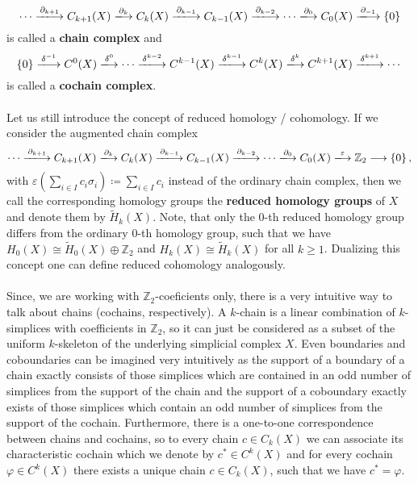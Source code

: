 \[
\cdots\xlongrightarrow{\partial_{k+1}} C_{k+1}(X)\xlongrightarrow{\partial_k} C_k(X)\xlongrightarrow{\partial_{k-1}} C_{k-1}(X)\xlongrightarrow{\partial_{k-2}}\cdots\xlongrightarrow{\partial_0} C_0(X)\xlongrightarrow{\partial_{-1}}\left\{0\right\}
\]
is called a \textbf{chain complex} and
\[
\left\{0\right\}\xlongrightarrow{\delta^{-1}}C^0(X)\xlongrightarrow{\delta^0}\cdots\xlongrightarrow{\delta^{k-2}} C^{k-1}(X)\xlongrightarrow{\delta^{k-1}} C^k(X)\xlongrightarrow{\delta^k} C^{k+1}(X)\xlongrightarrow{\delta^{k+1}}\cdots
\]
is called a \textbf{cochain complex}.\\
\\
Let us still introduce the concept of reduced homology / cohomology. If we consider the augmented chain complex
\[
\cdots\xlongrightarrow{\partial_{k+1}} C_{k+1}(X)\xlongrightarrow{\partial_k} C_k(X)\xlongrightarrow{\partial_{k-1}} C_{k-1}(X)\xlongrightarrow{\partial_{k-2}}\cdots\xlongrightarrow{\partial_0} C_0(X)\xlongrightarrow{\varepsilon}\mathbb{Z}_2\longrightarrow \left\{0\right\},
\]
with \(\varepsilon\left(\sum\limits_{i\in I}c_i\sigma_i\right)\coloneqq \sum\limits_{i\in I}c_i\) instead of the ordinary chain complex, then we call the corresponding homology groups the \textbf{reduced homology groups} of \(X\) and denote them by \(\tilde{H}_k(X)\). Note, that only the \(0\)-th reduced homology group differs from the ordinary \(0\)-th homology group, such that we have \(H_0(X)\cong\tilde{H}_0(X)\oplus\mathbb{Z}_2\) and \(H_k(X)\cong\tilde{H}_k(X)\) for all \(k\geq 1\). Dualizing this concept one can define reduced cohomology analogously.\\
\\
Since, we are working with \(\mathbb{Z}_2\)-coeficients only, there is a very intuitive way to talk about chains (cochains, respectively). A \(k\)-chain is a linear combination of \(k\)-simplices with coefficients in \(\mathbb{Z}_2\), so it can just be considered as a subset of the uniform \(k\)-skeleton of the underlying simplicial complex \(X\). Even boundaries and coboundaries can be imagined very intuitively as the support of a boundary of a chain exactly consists of those simplices which are contained in an odd number of simplices from the support of the chain and the support of a coboundary exactly exists of those simplices which contain an odd number of simplices from the support of the cochain. Furthermore, there is a one-to-one correspondence between chains and cochains, so to every chain \(c\in C_k(X)\) we can associate its characteristic cochain which we denote by \(c^*\in C^k(X)\) and for every cochain \(\varphi\in C^k(X)\) there exists a unique chain \(c\in C_k(X)\), such that we have \(c^*=\varphi\).\\
